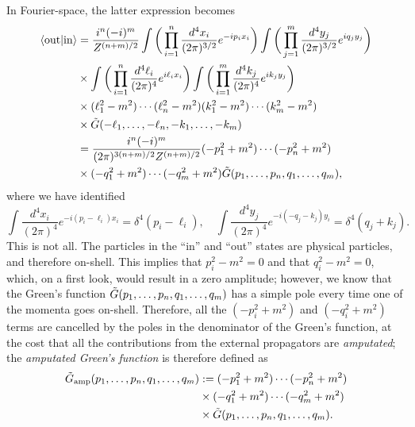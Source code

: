 In Fourier-space, the latter expression becomes 
\begin{equation}
    \begin{split}
        \langle \mathrm{out} | \mathrm{in} \rangle &= \frac{i^{n}(-i)^m}{Z^{(n + m)/2}}\int\bigg(\prod_{i=1}^n\frac{d^4x_i}{(2\pi)^{3/2}}e^{-ip_ix_i}\bigg)\int\bigg(\prod_{j=1}^m\frac{d^4y_j}{(2\pi)^{3/2}}e^{iq_jy_j}\bigg) \\
        &\times \int\bigg(\prod_{i=1}^n\frac{d^4\ell_i}{(2\pi)^4}e^{i\ell_ix_i}\bigg)\int\bigg(\prod_{i=1}^m\frac{d^4k_j}{(2\pi)^4}e^{ik_jy_j}\bigg) \\
        & \times (\ell_1^2 - m^2)\cdots(\ell_n^2 - m^2)(k_1^2 - m^2)\cdots(k_m^2 - m^2) \\
        &\times \tilde{G}(-\ell_1,\dots,-\ell_n,-k_1,\dots,-k_m) \\
        &= \frac{i^{n}(-i)^m}{(2\pi)^{3(n + m)/2}Z^{(n + m)/2}}(-p_1^2 + m^2)\cdots(-p_n^2 + m^2)\\
        &\times(-q_1^2 + m^2)\cdots(-q_m^2 + m^2)\tilde{G}(p_1,\dots,p_n,q_1,\dots,q_m),
    \end{split}
\end{equation}
where we have identified
\begin{equation}
    \int \frac{d^4x_i}{(2\pi)^4}e^{-i(p_i - \ell_i)x_i} = \delta^4(p_i - \ell_i),\quad \int \frac{d^4y_j}{(2\pi)^4}e^{-i(- q_j - k_j)y_i} = \delta^4(q_j + k_j).
\end{equation}
This is not all. The particles in the ``in'' and ``out'' states are physical particles, and therefore on-shell. This implies that $p_i^2 - m^2 = 0$ and that $q_i^2 - m^2 = 0$, which, on a first look, would result in a zero amplitude; however, we know that the Green's function $\tilde{G}(p_1,\dots,p_n,q_1,\dots,q_m)$ has a simple pole every time one of the momenta goes on-shell. Therefore, all the $(-p_i^2 + m^2)$ and $(-q_i^2 + m^2)$ terms are cancelled by the poles in the denominator of the Green's function, at the cost that all the contributions from the external propagators are \emph{amputated}; the \emph{amputated Green's function} is therefore defined as 
\begin{equation}
    \begin{split}
        \tilde{G}_{\mathrm{amp}}(p_1,\dots,p_n,q_1,\dots,q_m) &:= (-p_1^2 + m^2)\cdots(-p_n^2 + m^2) \\
        &\times (-q_1^2 + m^2)\cdots(-q_m^2 + m^2)\\
        &\times\tilde{G}(p_1,\dots,p_n,q_1,\dots,q_m).
    \end{split}
\end{equation}
